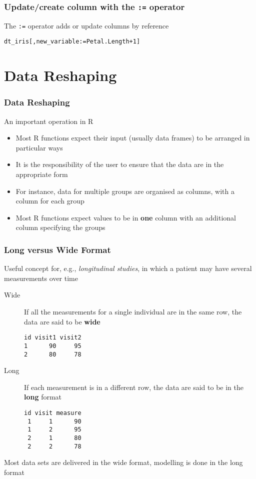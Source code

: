 \documentclass[paper=screen,mathserif]{beamer}\usepackage[]{graphicx}\usepackage[]{color}
\makeatletter
\newcommand{\hlnum}[1]{\textcolor[rgb]{0.686,0.059,0.569}{#1}}%
\newcommand{\hlopt}[1]{\textcolor[rgb]{0,0,0}{#1}}%
\newcommand{\hlstd}[1]{\textcolor[rgb]{0.345,0.345,0.345}{#1}}%
\newcommand{\hlkwb}[1]{\textcolor[rgb]{0.69,0.353,0.396}{#1}}%
\newenvironment{kframe}{%
 \def\at@end@of@kframe{}%
 \ifinner\ifhmode%
  \def\at@end@of@kframe{\end{minipage}}%
  \begin{minipage}{\columnwidth}%
 \fi\fi%
 \def\FrameCommand##1{\hskip\@totalleftmargin \hskip-\fboxsep
 \colorbox{shadecolor}{##1}\hskip-\fboxsep
     \hskip-\linewidth \hskip-\@totalleftmargin \hskip\columnwidth}%
 \MakeFramed {\advance\hsize-\width
   \@totalleftmargin\z@ \linewidth\hsize
   \@setminipage}}%
 {\par\unskip\endMakeFramed%
 \at@end@of@kframe}
\newenvironment{knitrout}{}{} %
\newcommand{\ft}[1]{\frametitle{#1}}
\newenvironment{xframe}[1][]
{\begin{frame}[fragile,environment=xframe]
    \frametitle{#1}}
  {\end{frame}}
\makeatother
\begin{document}
\begin{xframe}
  \ft{Update/create column with the {\tt :=} operator}
  
  The {\tt :=} operator adds or update columns by reference
  
\begin{knitrout}\tiny
{}\color{fgcolor}\begin{kframe}
\begin{alltt}
\hlstd{dt_iris[, new_variable} \hlkwb{:=} \hlstd{Petal.Length} \hlopt{+} \hlnum{1}\hlstd{]}
\end{alltt}
\end{kframe}
\end{knitrout}

\end{xframe}

\section{Data Reshaping}

\begin{frame}
  \ft{Data Reshaping}
  An important operation in R
  \begin{itemize}
  \item Most R functions expect their input (usually data frames) to
    be arranged in particular ways
  \item It is the responsibility of the user to ensure that the data
    are in the appropriate form
  \item For instance, data for multiple groups are organised as
    columns, with a column for each group
  \item Most R functions expect values to be in {\bf one} column with
    an additional column specifying the groups  
  \end{itemize}

\end{frame}

\begin{frame}[fragile]
  \ft{Long versus Wide Format} 
  
  Useful concept for, e.g., {\em longitudinal studies}, in which a
  patient may have several measurements over time
  \begin{description}
  \item[Wide] If all the measurements for a single individual are in
    the same row, the data are said to be {\bf wide}
    \small{
\begin{verbatim}
id visit1 visit2
1      90     95
2      80     78
\end{verbatim}}
  \item[Long] If each measurement is in a different row, the data are
    said to be in the {\bf long} format
\small{
\begin{verbatim}
id visit measure
 1     1      90
 1     2      95
 2     1      80
 2     2      78
\end{verbatim}}
  \end{description}
  Most data sets are delivered in the wide format, modelling is done
  in the long format
\end{frame}
\end{document}
